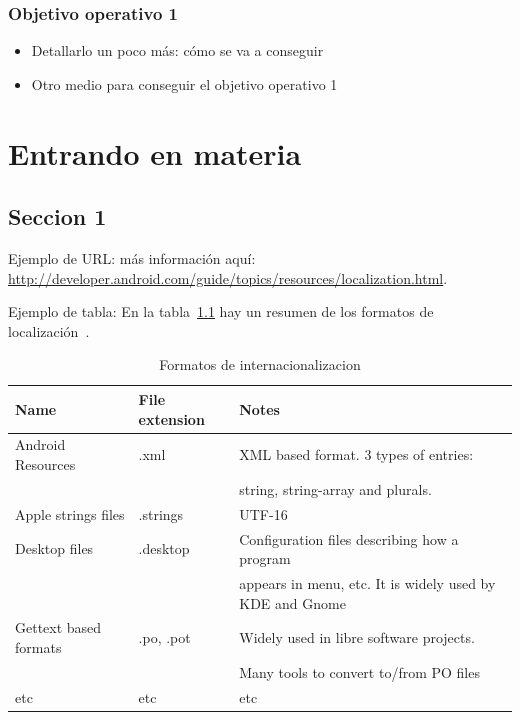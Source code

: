 \documentclass[a4paper, 12pt]{book}
\begin{document}
\subsection{Objetivo operativo 1}
\begin{itemize}
 \item Detallarlo un poco más: cómo se va a conseguir
 \item Otro medio para conseguir el objetivo operativo 1
\end{itemize}


\chapter{Entrando en materia}
\label{chap:materia}

\section{Seccion 1}

Ejemplo de URL: más información aquí: 
\url{http://developer.android.com/guide/topics/resources/localization.html}.

Ejemplo de tabla: En la tabla~\ref{tab:i18nformats} hay un resumen de los formatos
de localización~\cite{GPL}.

\begin{table}[htbp]
\footnotesize
\begin{center}
\begin{tabular}{|l|l|l|}
\hline
\textbf{Name} & \textbf{File extension} & \textbf{Notes} \\ \hline
Android Resources & .xml & XML based format. 3 types of entries: \\
 & & string, string-array and plurals. \\ \hline
Apple strings files & .strings & UTF-16 \\ \hline
Desktop files & .desktop & Configuration files describing how a program \\
 & & appears in menu, etc. It is widely used by KDE and Gnome \\ \hline
Gettext based formats & .po, .pot & Widely used in libre software projects.
\\
 & & Many tools to convert to/from PO files \\ \hline

etc & etc & etc \\ \hline
\end{tabular}
\end{center}
\caption{Formatos de internacionalizacion}
\label{tab:i18nformats}
\end{table}
\end{document}

